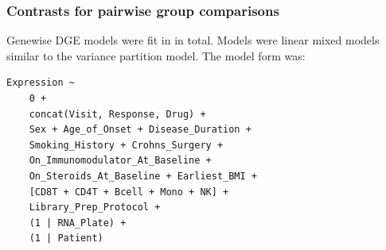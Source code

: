 \begin{outline}

\subsubsection{Contrasts for pairwise group comparisons}

Genewise \gls{DGE} models were fit in \autocite{hoffman2020DreamPowerfulDifferential} in total.
Models were linear mixed models similar to the variance partition model.
The model form was:

\begin{lstlisting}
Expression ~ 
    0 + 
    concat(Visit, Response, Drug) + 
    Sex + Age_of_Onset + Disease_Duration + 
    Smoking_History + Crohns_Surgery + 
    On_Immunomodulator_At_Baseline + 
    On_Steroids_At_Baseline + Earliest_BMI +
    [CD8T + CD4T + Bcell + Mono + NK] + 
    Library_Prep_Protocol +
    (1 | RNA_Plate) +
    (1 | Patient)
\end{lstlisting}


\end{outline}
